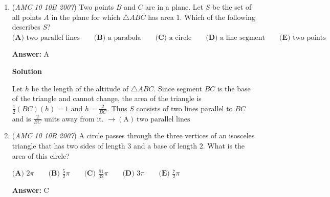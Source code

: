 \begin{enumerate}
 \[\text{``Lee's sis is a Mississippi miss, Chriss!''?}\]
$\textbf{(A) } g \qquad\textbf{(B) } h \qquad\textbf{(C) } o \qquad\textbf{(D) } s \qquad\textbf{(E) } t$

 \textbf{Answer: }D



\textbf{Solution}

Since the letter that will replace the last $s$ does not depend on any letter except the other $s$'s, you can disregard anything else. There are $12$ $s$'s, so the last $s$ will be replaced by the letter $1+2+3+\cdots+12$ places to the right of $s$.
 \[1+2+3+\cdots+12=12 \times \frac{1+12}{2} = 78\]Every $26$ places, you will end up with the same letter so you can just take the remainder of $78$ when you divide by $26,$ which is $0.$ Therefore, the letter that will replace the last $s$ is $\boxed{\textbf{(D) } s}$



	\item (\textit{AMC 10 10B 2007}) Two points $B$ and $C$ are in a plane. Let $S$ be the set of all points $A$ in the plane for which $\triangle ABC$ has area $1.$ Which of the following describes $S?$
$\textbf{(A) } \text{two parallel lines} \qquad\textbf{(B) } \text{a parabola} \qquad\textbf{(C) } \text{a circle} \qquad\textbf{(D) } \text{a line segment} \qquad\textbf{(E) } \text{two points}$

 \textbf{Answer: }A



\textbf{Solution}

Let $h$ be the length of the altitude of $\triangle ABC.$ Since segment $BC$ is the base of the triangle and cannot change, the area of the triangle is $\frac{1}{2}(BC)(h)=1$ and $h=\frac{2}{BC}.$ Thus $S$ consists of two lines parallel to $BC$ and is $\frac{2}{BC}$ units away from it. $\longrightarrow \boxed{\mathrm{(A) \ } \text{two parallel lines}}$



	\item (\textit{AMC 10 10B 2007}) A circle passes through the three vertices of an isosceles triangle that has two sides of length $3$ and a base of length $2.$ What is the area of this circle?


 $\textbf{(A) } 2\pi \qquad\textbf{(B) } \frac{5}{2}\pi \qquad\textbf{(C) } \frac{81}{32}\pi \qquad\textbf{(D) } 3\pi \qquad\textbf{(E) } \frac{7}{2}\pi$

 \textbf{Answer: }C




\end{enumerate}
